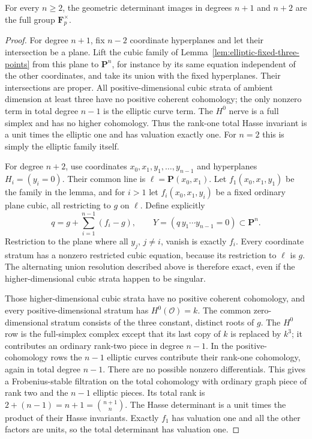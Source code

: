 \begin{proposition}\label{prop:pn-seed-full-determinant}
For every $n\geq2$, the geometric determinant images in degrees
$n+1$ and $n+2$ are the full group $\mathbf F_p^\times$.
\end{proposition}

\begin{proof}
For degree $n+1$, fix $n-2$ coordinate hyperplanes and let their
intersection be a plane.  Lift the cubic family of
Lemma~\ref{lem:elliptic-fixed-three-points} from this plane to
$\mathbf P^n$, for instance by its same equation independent
of the other coordinates, and take its union with the fixed
hyperplanes.  Their intersections are proper.  All
positive-dimensional cubic strata of ambient dimension at
least three have no positive coherent cohomology; the only
nonzero term in total degree $n-1$ is the elliptic curve term.
The $H^0$ nerve is a full simplex and has no higher cohomology.
Thus the rank-one total Hasse invariant is a unit times the
elliptic one and has valuation exactly one.
For $n=2$ this is simply the elliptic family itself.

For degree $n+2$, use coordinates
$x_0,x_1,y_1,\ldots,y_{n-1}$ and hyperplanes $H_i=(y_i=0)$.
Their common line is $\ell=\mathbf P(x_0,x_1)$.
Let $f_1(x_0,x_1,y_1)$ be the family in the lemma, and for
$i>1$ let $f_i(x_0,x_1,y_i)$ be a fixed ordinary plane cubic,
all restricting to $g$ on $\ell$.  Define explicitly
\[
 q=g+\sum_{i=1}^{n-1}(f_i-g),\qquad
 Y=(q\,y_1\cdots y_{n-1}=0)\subset\mathbf P^n.
 \tag{3}
\]
Restriction to the plane where all $y_j$, $j\ne i$, vanish
is exactly $f_i$.  Every coordinate stratum has a nonzero
restricted cubic equation, because its restriction to $\ell$
is $g$.  The alternating union resolution described above
is therefore exact, even if the higher-dimensional cubic
strata happen to be singular.

Those higher-dimensional cubic strata have no positive
coherent cohomology, and every positive-dimensional stratum
has $H^0(\mathcal O)=k$.  The common zero-dimensional stratum
consists of the three constant, distinct roots of $g$.
The $H^0$ row is the full-simplex complex except that its last
copy of $k$ is replaced by $k^3$; it contributes an ordinary
rank-two piece in degree $n-1$.  In the positive-cohomology
rows the $n-1$ elliptic curves contribute their rank-one
cohomology, again in total degree $n-1$.  There are no
possible nonzero differentials.  This gives a Frobenius-stable
filtration on the total cohomology with ordinary graph piece
of rank two and the $n-1$ elliptic pieces.  Its total rank is
$2+(n-1)=n+1=\binom{n+1}{n}$.
The Hasse determinant is a unit times the product of their
Hasse invariants.  Exactly $f_1$ has valuation one and all the
other factors are units, so the total determinant has
valuation one.


\end{proof}
